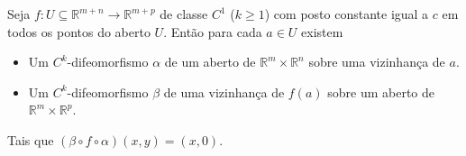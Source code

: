 \begin{theorem}
  Seja $f:U\subseteq\mathbb{R}^{m+n}\to\mathbb{R}^{m+p}$ de classe $C^{1}$ ($k\geq 1$) com posto constante igual a $c$ em todos os pontos do aberto $U$. Então para cada $a\in U$ existem
  \begin{itemize}
    \item Um $C^{k}$-difeomorfismo $\alpha$ de um aberto de $\mathbb{R}^{m}\times\mathbb{R}^{n}$ sobre uma vizinhança de $a$.
    \item Um $C^{k}$-difeomorfismo $\beta$ de uma vizinhança de $f(a)$ sobre um aberto de $\mathbb{R}^{m}\times\mathbb{R}^{p}$. 
  \end{itemize}
  Tais que $(\beta\circ f\circ \alpha)(x,y)=(x,0)$.
  \begin{center}
      
  \end{center}
\end{theorem}
